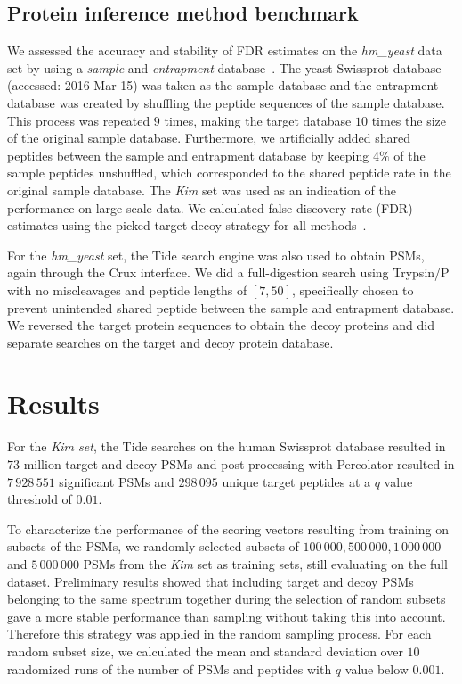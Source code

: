 \documentclass{article}
\begin{document}
\subsection*{Protein inference method benchmark}

We assessed the accuracy and stability of FDR estimates on the {\em
hm\_yeast} data set by using a {\em sample} and {\em entrapment}
database~\cite{granholm2013determining}. The yeast Swissprot database
(accessed: 2016 Mar 15) was taken as the sample database and the
entrapment database was created by shuffling the peptide sequences of
the sample database. This process was repeated $9$ times, making the
target database $10$ times the size of the original sample database.
Furthermore, we artificially added shared peptides between the sample
and entrapment database by keeping $4\%$ of the sample peptides
unshuffled, which corresponded to the shared peptide rate in the
original sample database. The {\em Kim} set was used as an
indication of the performance on large-scale data. We calculated false
discovery rate (FDR) estimates using the picked target-decoy strategy
for all methods~\cite{savitski2015scalable}.

For the {\em hm\_yeast} set, the Tide search engine was also used to
obtain PSMs, again through the Crux interface. We did a full-digestion
search using Trypsin/P with no miscleavages and peptide lengths of
$[7,50]$, specifically chosen to prevent unintended shared peptide
between the sample and entrapment database. We reversed the target
protein sequences to obtain the decoy proteins and did separate
searches on the target and decoy protein database.

\section*{Results}

For the {\em Kim set}, the Tide searches on the human Swissprot
database resulted in $73$ million target and decoy PSMs and
post-processing with Percolator resulted in $7\,928\,551$ significant
PSMs and $298\,095$ unique target peptides at a $q$ value threshold of
$0.01$.

To characterize the performance of the scoring vectors resulting from
training on subsets of the PSMs, we randomly selected subsets of
$100\,000, 500\,000, 1\,000\,000$ and $5\,000\,000$ PSMs from the {\em
  Kim} set as training sets, still evaluating on the full
dataset. Preliminary results showed that including target and decoy
PSMs belonging to the same spectrum together during the selection of
random subsets gave a more stable performance than sampling without
taking this into account. Therefore this strategy was applied in the
random sampling process. For each random subset size, we calculated
the mean and standard deviation over $10$ randomized runs of the
number of PSMs and peptides with $q$ value below $0.001$.
\end{document}

